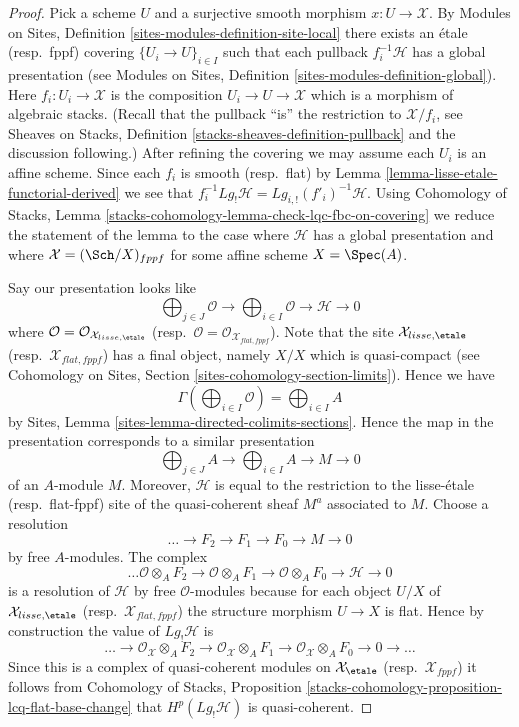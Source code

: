 \begin{proof}
Pick a scheme $U$ and a surjective smooth morphism $x : U \to \mathcal{X}$. By
Modules on Sites, Definition \ref{sites-modules-definition-site-local}
there exists an \'etale (resp.\ fppf) covering
$\{U_i \to U\}_{i \in I}$ such that each pullback $f_i^{-1}\mathcal{H}$
has a global presentation (see
Modules on Sites, Definition \ref{sites-modules-definition-global}).
Here $f_i : U_i \to \mathcal{X}$ is the composition
$U_i \to U \to \mathcal{X}$ which is a morphism of algebraic stacks.
(Recall that the pullback ``is'' the restriction to $\mathcal{X}/f_i$, see
Sheaves on Stacks, Definition \ref{stacks-sheaves-definition-pullback}
and the discussion following.)
After refining the covering we may assume each $U_i$ is an affine scheme.
Since each $f_i$ is smooth (resp.\ flat) by
Lemma \ref{lemma-lisse-etale-functorial-derived}
we see that $f_i^{-1}Lg_!\mathcal{H} = Lg_{i, !}(f'_i)^{-1}\mathcal{H}$.
Using
Cohomology of Stacks,
Lemma \ref{stacks-cohomology-lemma-check-lqc-fbc-on-covering}
we reduce the statement of the lemma to the case where $\mathcal{H}$
has a global presentation and where $\mathcal{X} = (\Sch/X)_{fppf}$
for some affine scheme $X = \Spec(A)$.

\medskip\noindent
Say our presentation looks like
$$
\bigoplus\nolimits_{j \in J} \mathcal{O} \longrightarrow
\bigoplus\nolimits_{i \in I} \mathcal{O} \longrightarrow
\mathcal{H} \longrightarrow 0
$$
where $\mathcal{O} = \mathcal{O}_{\mathcal{X}_{lisse,\etale}}$
(resp.\ $\mathcal{O} = \mathcal{O}_{\mathcal{X}_{flat,fppf}}$).
Note that the site $\mathcal{X}_{lisse,\etale}$
(resp.\ $\mathcal{X}_{flat,fppf}$) has a final object, namely
$X/X$ which is quasi-compact (see
Cohomology on Sites, Section \ref{sites-cohomology-section-limits}).
Hence we have
$$
\Gamma(\bigoplus\nolimits_{i \in I} \mathcal{O}) =
\bigoplus\nolimits_{i \in I} A
$$
by Sites, Lemma \ref{sites-lemma-directed-colimits-sections}. Hence the map
in the presentation corresponds to a similar presentation
$$
\bigoplus\nolimits_{j \in J} A \longrightarrow
\bigoplus\nolimits_{i \in I} A \longrightarrow
M \longrightarrow 0
$$
of an $A$-module $M$. Moreover, $\mathcal{H}$ is equal to the restriction
to the lisse-\'etale (resp.\ flat-fppf) site of the quasi-coherent sheaf
$M^a$ associated to $M$. Choose a resolution
$$
\ldots \to F_2 \to F_1 \to F_0 \to M \to 0
$$
by free $A$-modules. The complex
$$
\ldots \mathcal{O} \otimes_A F_2 \to \mathcal{O} \otimes_A F_1 \to
\mathcal{O} \otimes_A F_0 \to \mathcal{H} \to 0
$$
is a resolution of $\mathcal{H}$ by free $\mathcal{O}$-modules because
for each object $U/X$ of $\mathcal{X}_{lisse,\etale}$
(resp.\ $\mathcal{X}_{flat,fppf}$) the structure morphism $U \to X$
is flat. Hence by construction the value of $Lg_!\mathcal{H}$ is
$$
\ldots \to
\mathcal{O}_\mathcal{X} \otimes_A F_2 \to
\mathcal{O}_\mathcal{X} \otimes_A F_1 \to
\mathcal{O}_\mathcal{X} \otimes_A F_0 \to 0 \to \ldots
$$
Since this is a complex of quasi-coherent modules on
$\mathcal{X}_\etale$ (resp.\ $\mathcal{X}_{fppf}$)
it follows from
Cohomology of Stacks,
Proposition \ref{stacks-cohomology-proposition-lcq-flat-base-change}
that $H^p(Lg_!\mathcal{H})$ is quasi-coherent.
\end{proof}
